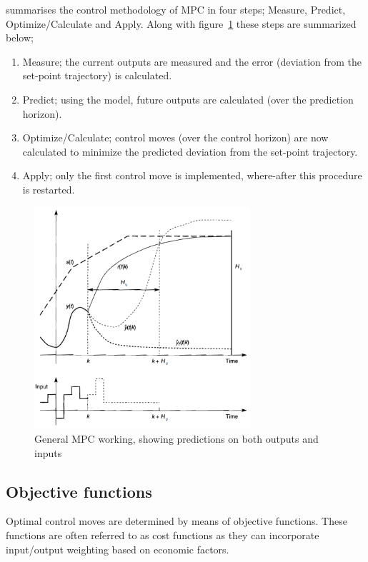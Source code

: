 \citet[8]{maciejowskimpc} summarises the control methodology of MPC in four 
steps; Measure, Predict, Optimize/Calculate and Apply. Along with 
figure~\ref{fig:mpc:general} these steps are summarized below;
\begin{enumerate}
  \item Measure; the current outputs are measured and the error (deviation from
    the set-point trajectory) is calculated.
  \item Predict; using the model, future outputs are calculated (over the 
    prediction horizon).
  \item Optimize/Calculate; control moves (over the control horizon) are now
    calculated to minimize the predicted deviation from the set-point trajectory.
  \item Apply; only the first control move is implemented, where-after this 
    procedure is restarted.
\end{enumerate}
\begin{figure}[htbp]
  \centering
  \includegraphics[width=8cm]{graph/mpc_general}
  \caption[General MPC working]{General MPC working, showing predictions on both outputs and inputs}
  \label{fig:mpc:general}
\end{figure}

\subsection{Objective functions}
Optimal control moves are determined by means of objective functions. These 
functions are often referred to as cost functions \citep[41]{maciejowskimpc} as
they can incorporate input/output weighting based on economic factors.

